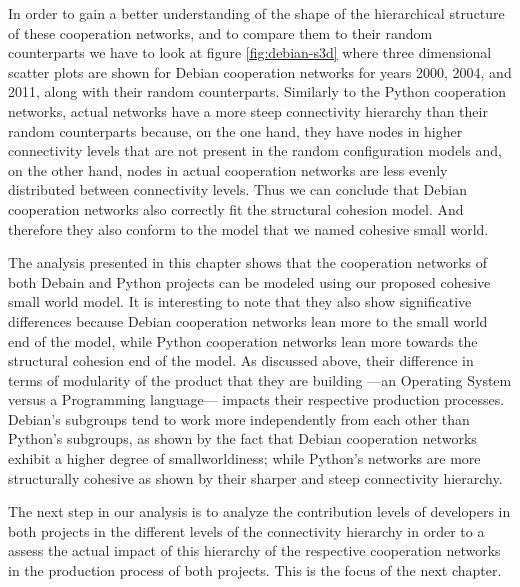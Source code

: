 In order to gain a better understanding of the shape of the hierarchical structure of these cooperation networks, and to compare them to their random counterparts we have to look at figure \ref{fig:debian-s3d} where three dimensional scatter plots are shown for Debian cooperation networks for years 2000, 2004, and 2011, along with their random counterparts. Similarly to the Python cooperation networks, actual networks have a more steep connectivity hierarchy than their random counterparts because, on the one hand, they have nodes in higher connectivity levels that are not present in the random configuration models and, on the other hand, nodes in actual cooperation networks are less evenly distributed between connectivity levels. Thus we can conclude that Debian cooperation networks also correctly fit the structural cohesion model. And therefore they also conform to the model that we named cohesive small world.

The analysis presented in this chapter shows that the cooperation networks of both Debain and Python projects can be modeled using our proposed cohesive small world model. It is interesting to note that they also show significative differences because Debian cooperation networks lean more to the small world end of the model, while Python cooperation networks lean more towards the structural cohesion end of the model. As discussed above, their difference in terms of modularity of the product that they are building ---an Operating System versus a Programming language--- impacts their respective production processes. Debian's subgroups tend to work more independently from each other than Python's subgroups, as shown by the fact that Debian cooperation networks exhibit a higher degree of smallworldiness; while Python's networks are more structurally cohesive as shown by their sharper and steep connectivity hierarchy.

The next step in our analysis is to analyze the contribution levels of developers in both projects in the different levels of the connectivity hierarchy in order to a assess the actual impact of this hierarchy of the respective cooperation networks in the production process of both projects. This is the focus of the next chapter.


